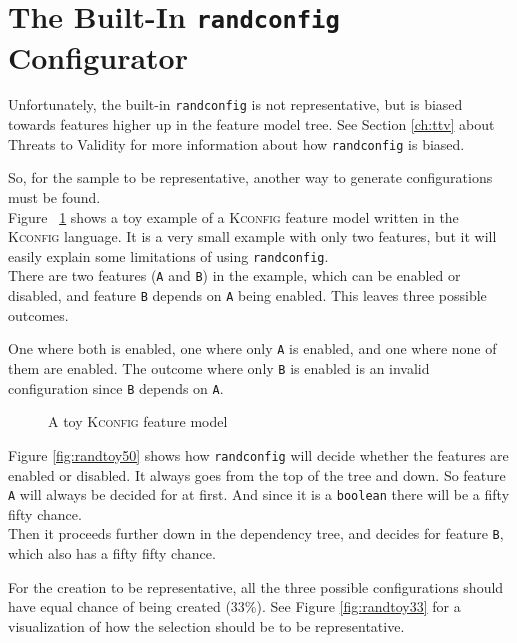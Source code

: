 \documentclass[a4paper,11pt]{report}
\newcommand{\figa}{
    \begin{figure}[!htpb]
    \centering
}
\newcommand{\figb}[2]{
    \caption{#1}
    \label{#2}
    \end{figure}
}
\begin{document}
\iffalse %
            \section{The Built-In \texttt{randconfig} Configurator}
Unfortunately, the built-in \texttt{randconfig} is not representative, but is 
biased towards features higher up in the feature model tree. See Section 
\ref{ch:ttv} about Threats to Validity for more information about how 
\texttt{randconfig} is biased.

So, for the sample to be representative, another way to generate configurations 
must be found.
\\

Figure ~\ref{randconfigtoy} shows a toy example of a \textsc{Kconfig} feature 
model written in the \textsc{Kconfig} language.  It is a very small example 
with only two features, but it will easily explain some limitations of using 
\texttt{randconfig}.
\\

There are two features (\texttt{A} and \texttt{B}) in the example, which can be 
enabled or disabled, and feature \texttt{B} depends on \texttt{A} being enabled.
This leaves three possible outcomes. 

One where both is enabled, one where only \texttt{A} is enabled, and one where 
none of them are enabled. The outcome where only \texttt{B} is enabled is an 
invalid configuration since \texttt{B} depends on \texttt{A}.

\figa
    
\figb{A toy \textsc{Kconfig} feature model}{randconfigtoy}

Figure \ref{fig:randtoy50} shows how \texttt{randconfig} will decide whether 
the features are enabled or disabled. It always goes from the top of the tree 
and down. So feature \texttt{A} will always be decided for at first. And since 
it is a \texttt{boolean} there will be a fifty fifty chance.
\\

Then it proceeds further down in the dependency tree, and decides for feature
\texttt{B}, which also has a fifty fifty chance.

For the creation to be representative, all the three possible configurations 
should have equal chance of being created (33\%). See Figure 
\ref{fig:randtoy33} for a visualization of how the selection should 
be to be representative.
\end{document}
